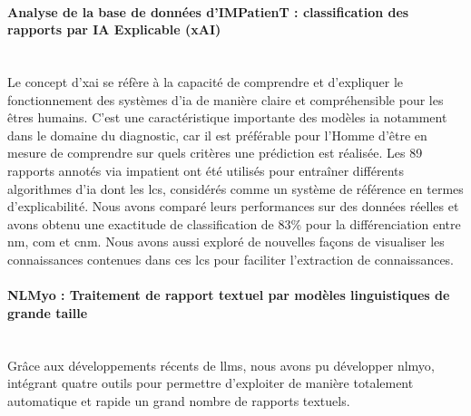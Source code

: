 \paragraph{\textbf{Analyse de la base de données d’IMPatienT : classification des rapports par IA Explicable (xAI)}}\mbox{}\\

Le concept d’\gls{xai} se réfère à la capacité de comprendre et d’expliquer le fonctionnement des systèmes d’\gls{ia} de manière claire et compréhensible pour les êtres humains. C’est une caractéristique importante des modèles \gls{ia} notamment dans le domaine du diagnostic, car il est préférable pour l’Homme d’être en mesure de comprendre sur quels critères une prédiction est réalisée. Les 89 rapports annotés via \gls{impatient} ont été utilisés pour entraîner différents algorithmes d'\gls{ia} dont les \gls{lcs}, considérés comme un système de référence en termes d’explicabilité. Nous avons comparé leurs performances sur des données réelles et avons obtenu une exactitude de classification de 83\% pour la différenciation entre \gls{nm}, \gls{com} et \gls{cnm}. Nous avons aussi exploré de nouvelles façons de visualiser les connaissances contenues dans ces \gls{lcs} pour faciliter l’extraction de connaissances.

\paragraph{\textbf{NLMyo : Traitement de rapport textuel par modèles linguistiques de grande taille}}\mbox{}\\

Grâce aux développements récents de \gls{llms}, nous avons pu développer \gls{nlmyo}, intégrant quatre outils pour permettre d’exploiter de manière totalement automatique et rapide un grand nombre de rapports textuels.

